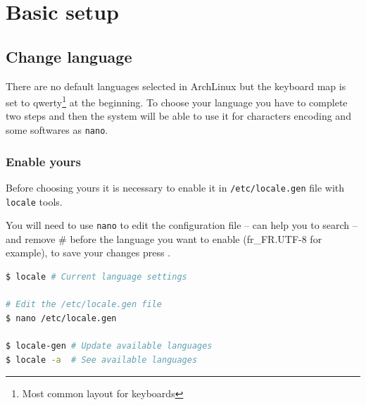 \chapter{Basic setup}

\section{Change language}
There are no default languages selected in ArchLinux but the keyboard map is set to 
qwerty\footnote{Most common layout for keyboards} at the beginning. To choose 
your language you have to complete two steps and then the system will be able to 
use it for characters encoding and some softwares as \texttt{nano}.

\subsection{Enable yours}
Before choosing yours it is necessary to enable it in \texttt{/etc/locale.gen}
file with \texttt{locale} tools. 

You will need to use \texttt{nano} to edit the configuration file --  can help you to search -- and remove \og\#\fg{} before the language you want 
to enable (fr\_FR.UTF-8 for example), to save your changes press .
\\
\begin{lstlisting}[language=bash,caption=Enable your language]
$ locale # Current language settings

# Edit the /etc/locale.gen file
$ nano /etc/locale.gen

$ locale-gen # Update available languages
$ locale -a  # See available languages
\end{lstlisting}

